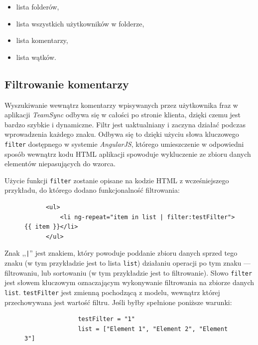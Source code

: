 \documentclass[polish,a4paper,twoside]{ppfcmthesis}
\begin{document}
\begin{itemize}[noitemsep]
  \item lista folderów,
  \item lista wszystkich użytkowników w folderze,
  \item lista komentarzy,
  \item lista wątków.
\end{itemize}


\subsection{Filtrowanie komentarzy}

Wyszukiwanie wewnątrz komentarzy wpisywanych przez użytkownika fraz w aplikacji \emph{TeamSync} odbywa się w całości po stronie klienta, dzięki czemu jest bardzo szybkie i dynamiczne. Filtr jest uaktualniany i zaczyna działać podczas wprowadzenia każdego znaku. Odbywa się to dzięki użyciu słowa kluczowego \texttt{filter} dostępnego w systemie \emph{AngularJS}, którego umieszczenie w odpowiedni sposób wewnątrz kodu HTML aplikacji spowoduje wykluczenie ze zbioru danych elementów niepasujących do wzorca.

Użycie funkcji \texttt{filter} zostanie opisane na kodzie HTML z wcześniejszego przykładu, do którego dodano funkcjonalność filtrowania:

\begin{figure}[htb]
\begin{verbatim}
      <ul>
          <li ng-repeat="item in list | filter:testFilter">{{ item }}</li>
      </ul>
\end{verbatim}
\end{figure}

Znak ,,\texttt{|}'' jest znakiem, który powoduje poddanie zbioru danych sprzed tego znaku (w tym przykładzie jest to lista \texttt{list}) działaniu operacji po tym znaku --- filtrowaniu, lub sortowaniu (w tym przykładzie jest to filtrowanie). Słowo \texttt{filter} jest słowem kluczowym oznaczającym wykonywanie filtrowania na zbiorze danych \texttt{list}. \texttt{testFilter} jest zmienną pochodzącą z modelu, wewnątrz której przechowywana jest wartość filtru. Jeśli byłby spełnione poniższe warunki:

\begin{figure}[htb]
\begin{verbatim}
               testFilter = "1"
               list = ["Element 1", "Element 2", "Element 3"]
\end{verbatim}
\end{figure}
\end{document}
